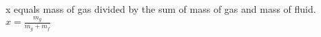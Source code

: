 x equals mass of gas divided by the sum of mass of gas and mass of fluid.  
\( x = \frac{m_g}{m_g + m_f} \)